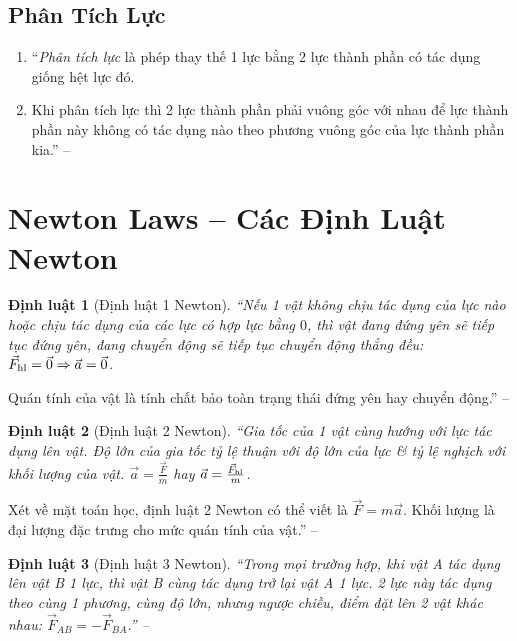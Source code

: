 \documentclass{article}
\newtheorem{dinhluat}{Định luật}
\begin{document}
\subsection{Phân Tích Lực}
\begin{enumerate}
	\item ``{\it Phân tích lực} là phép thay thế 1 lực bằng 2 lực thành phần có tác dụng giống hệt lực đó.
	\item Khi phân tích lực thì 2 lực thành phần phải vuông góc với nhau để lực thành phần này không có tác dụng nào theo phương vuông góc của lực thành phần kia.'' -- \cite[p. 19]{Giang_Hang_Trung_ncpt_Vat_Ly_10}
\end{enumerate}


\section{Newton Laws -- Các Định Luật Newton}

\begin{dinhluat}[Định luật 1 Newton]
	``Nếu 1 vật không chịu tác dụng của lực nào hoặc chịu tác dụng của các lực có hợp lực bằng $0$, thì vật đang đứng yên sẽ tiếp tục đứng yên, đang chuyển động sẽ tiếp tục chuyển động thẳng đều: $\vec{F}_{\rm hl} = \vec{0}\Rightarrow\vec{a} = \vec{0}$.
\end{dinhluat}
Quán tính của vật là tính chất bảo toàn trạng thái đứng yên hay chuyển động.'' -- \cite[p. 19]{Giang_Hang_Trung_ncpt_Vat_Ly_10}

\begin{dinhluat}[Định luật 2 Newton]
	``Gia tốc của 1 vật cùng hướng với lực tác dụng lên vật. Độ lớn của gia tốc tỷ lệ thuận với độ lớn của lực \& tỷ lệ nghịch với khối lượng của vật. $\vec{a} = \frac{\vec{F}}{m}$ hay $\vec{a} = \frac{\vec{F}_{\rm hl}}{m}$.
\end{dinhluat}
Xét về mặt toán học, định luật 2 Newton có thể viết là $\vec{F} = m\vec{a}$. Khối lượng là đại lượng đặc trưng cho mức quán tính của vật.'' -- \cite[p. 19]{Giang_Hang_Trung_ncpt_Vat_Ly_10}

\begin{dinhluat}[Định luật 3 Newton]
	``Trong mọi trường hợp, khi vật A tác dụng lên vật B 1 lực, thì vật B cùng tác dụng trở lại vật A 1 lực. 2 lực này tác dụng theo cùng 1 phương, cùng độ lớn, nhưng ngược chiều, điểm đặt lên 2 vật khác nhau: $\vec{F}_{AB} = -\vec{F}_{BA}$.'' -- \cite[p. 20]{Giang_Hang_Trung_ncpt_Vat_Ly_10}
\end{dinhluat}
\end{document}
